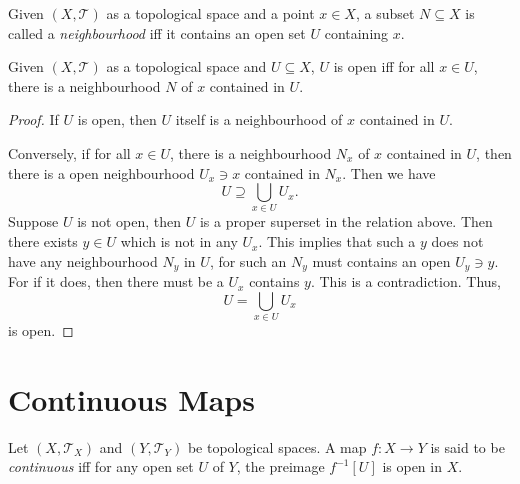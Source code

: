 \begin{definition}
	[neighbourhood]
	\label{def: neighbourhood}
	Given $(X, \mathcal T)$ as a topological space and a point $x \in X$, a subset $N \subseteq X$ is called a \textit{neighbourhood} iff it contains an open set $U$ containing $x$.
\end{definition}


\begin{proposition}
	\label{prop: alt-def of open sets by neighbourhoods}
	Given $(X, \mathcal T)$ as a topological space and $U \subseteq X$, $U$ is open iff for all $x \in U$, there is a neighbourhood $N$ of $x$ contained in $U$.
	
	\begin{proof}
		If $U$ is open, then $U$ itself is a neighbourhood of $x$ contained in $U$.
		
		Conversely, if for all $x \in U$, there is a neighbourhood $N_x$ of $x$ contained in $U$, then there is a open neighbourhood $U_x \ni x$ contained in $N_x$. Then we have
		$$
		U \supseteq \bigcup_{x \in U} U_x.
		$$
		Suppose $U$ is not open, then $U$ is a proper superset in the relation above. Then there exists $y \in U$ which is not in any $U_x$. This implies that such a $y$ does not have any neighbourhood $N_y$ in $U$, for such an $N_y$ must contains an open $U_y \ni y$. For if it does, then there must be a $U_x$ contains $y$. This is a contradiction. Thus,
		$$
		U = \bigcup_{x \in U} U_x
		$$
		is open.
	\end{proof}
\end{proposition}


\section{Continuous Maps}


\begin{definition}
	\label{def: continuous maps}
	Let $(X, \mathcal T_X)$ and $(Y, \mathcal T_Y)$ be topological spaces. A map $f: X \to Y$ is said to be \textit{continuous} iff for any open set $U$ of $Y$, the preimage $f^{-1}[U]$ is open in $X$.
\end{definition}


